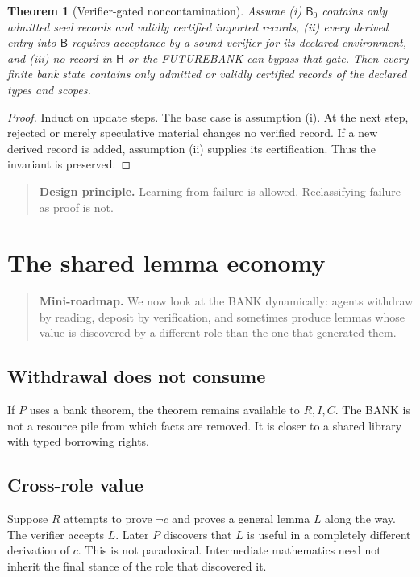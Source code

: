 \documentclass[11pt,openany]{book}
\newtheorem{theorem}{Theorem}[chapter]
\theoremstyle{definition}
\theoremstyle{remark}
\newenvironment{miniroadmap}{\begin{quote}\small\color{deepblue}\textbf{Mini-roadmap.} }{\end{quote}}
\newenvironment{designbox}{\begin{quote}\small\color{green!35!black}\textbf{Design principle.} }{\end{quote}}
\newcommand{\Bank}{\mathsf{B}}
\newcommand{\Hist}{\mathsf{H}}
\begin{document}
\begin{theorem}[Verifier-gated noncontamination]\label{thm:noncontam}
Assume (i) $\Bank_0$ contains only admitted seed records and validly certified imported records, (ii) every derived entry into $\Bank$ requires acceptance by a sound verifier for its declared environment, and (iii) no record in $\Hist$ or the FUTUREBANK can bypass that gate. Then every finite bank state contains only admitted or validly certified records of the declared types and scopes.
\end{theorem}
\begin{proof}
Induct on update steps. The base case is assumption (i). At the next step, rejected or merely speculative material changes no verified record. If a new derived record is added, assumption (ii) supplies its certification. Thus the invariant is preserved.
\end{proof}

\begin{designbox}
Learning from failure is allowed. Reclassifying failure as proof is not.
\end{designbox}

\chapter{The shared lemma economy}
\begin{miniroadmap}
We now look at the BANK dynamically: agents withdraw by reading, deposit by verification, and sometimes produce lemmas whose value is discovered by a different role than the one that generated them.
\end{miniroadmap}

\section{Withdrawal does not consume}
If $P$ uses a bank theorem, the theorem remains available to $R,I,C$. The BANK is not a resource pile from which facts are removed. It is closer to a shared library with typed borrowing rights.

\section{Cross-role value}
Suppose $R$ attempts to prove $\neg c$ and proves a general lemma $L$ along the way. The verifier accepts $L$. Later $P$ discovers that $L$ is useful in a completely different derivation of $c$. This is not paradoxical. Intermediate mathematics need not inherit the final stance of the role that discovered it.
\end{document}
